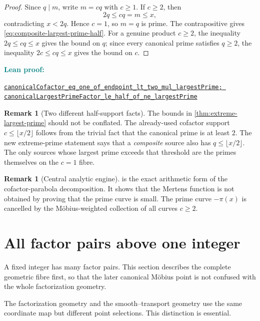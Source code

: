 \documentclass[11pt]{article}
\theoremstyle{definition}
\newtheorem{remark}[theorem]{Remark}
\newcommand{\1}{\mathbf{1}}
\newcommand{\leanxref}[3]{%
  \par\smallskip
  {\small\noindent\textcolor{teal}{\textbf{#1:}}\par
  \noindent\href{#3}{\nolinkurl{#2}}\par}
  \smallskip
}
\begin{document}
\begin{proof}
Since $q\mid m$, write $m=cq$ with $c\ge1$.  If $c\ge2$, then
\[
 2q\le cq=m\le x,
\]
contradicting $x<2q$.  Hence $c=1$, so $m=q$ is prime.  The contrapositive gives \cref{eq:composite-largest-prime-half}.  For a genuine product $c\ge2$, the inequality $2q\le cq\le x$ gives the bound on $q$; since every canonical prime satisfies $q\ge2$, the inequality $2c\le cq\le x$ gives the bound on $c$.
\end{proof}
\leanxref{Lean proof}{canonicalCofactor_eq_one_of_endpoint_lt_two_mul_largestPrime; canonicalLargestPrimeFactor_le_half_of_ne_largestPrime}{https://github.com/OVVO-Financial/square-block-mobius/blob/main/lean/RHLean/Analysis/CanonicalExtremePrimeSupport.lean}

\begin{remark}[Two different half-support facts]
The bounds in \cref{thm:extreme-largest-prime} should not be conflated.  The already-used cofactor support $c\le\lfloor x/2\rfloor$ follows from the trivial fact that the canonical prime is at least $2$.  The new extreme-prime statement says that a \emph{composite} source also has $q\le\lfloor x/2\rfloor$.  The only sources whose largest prime exceeds that threshold are the primes themselves on the $c=1$ fibre.
\end{remark}

\begin{remark}[Central analytic engine]
 is the exact arithmetic form of the
cofactor-parabola decomposition.  It shows that the Mertens function is
not obtained by proving that the prime curve is small.  The prime curve
$-\pi(x)$ is cancelled by the M\"obius-weighted collection of all
curves $c\ge2$.
\end{remark}

\section{All factor pairs above one integer}
\label{sec:full-fibre}

A fixed integer has many factor pairs.  This section describes the complete geometric fibre first, so that the later canonical M\"obius point is not confused with the whole factorization geometry.

The factorization geometry and the smooth--transport geometry use the same coordinate map but different point selections.  This distinction is essential.
\end{document}
